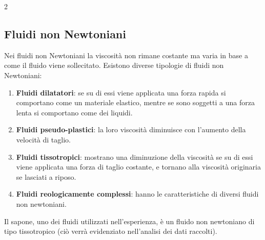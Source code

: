 \documentclass{article}
\begin{document}
\begin{multicols}{2}
\subsection{Fluidi non Newtoniani}
Nei fluidi non Newtoniani la viscosità non rimane costante ma varia in base a come il fluido viene sollecitato. Esistono diverse tipologie di fluidi non Newtoniani:
\begin{enumerate}
    \item \textbf{Fluidi dilatatori}: se su di essi viene applicata una forza rapida si comportano come un materiale elastico, mentre se sono soggetti a una forza lenta si comportano come dei liquidi. 
    \item \textbf{Fluidi pseudo-plastici}: la loro viscosità diminuisce con l'aumento della velocità di taglio.
    \item \textbf{Fluidi tissotropici}: mostrano una diminuzione della viscosità se su di essi viene applicata una forza di taglio costante, e tornano alla viscosità originaria se lasciati a riposo.
    \item \textbf{Fluidi reologicamente complessi}: hanno le caratteristiche di diversi fluidi non newtoniani.
\end{enumerate}
Il sapone, uno dei fluidi utilizzati nell'esperienza, è un fluido non newtoniano di tipo tissotropico (ciò verrà evidenziato nell'analisi dei dati raccolti).

\end{multicols}
\end{document}
